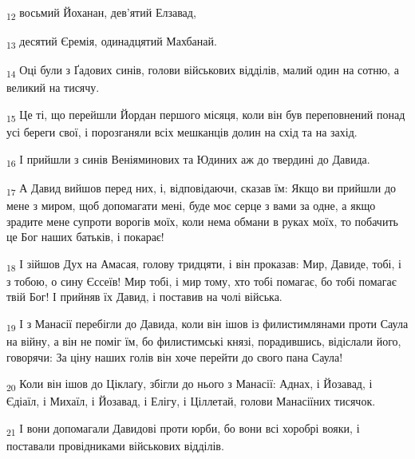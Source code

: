 \begin{tcolorbox}
\textsubscript{12} восьмий Йоханан, дев'ятий Елзавад,
\end{tcolorbox}
\begin{tcolorbox}
\textsubscript{13} десятий Єремія, одинадцятий Махбанай.
\end{tcolorbox}
\begin{tcolorbox}
\textsubscript{14} Оці були з Ґадових синів, голови військових відділів, малий один на сотню, а великий на тисячу.
\end{tcolorbox}
\begin{tcolorbox}
\textsubscript{15} Це ті, що перейшли Йордан першого місяця, коли він був переповнений понад усі береги свої, і порозганяли всіх мешканців долин на схід та на захід.
\end{tcolorbox}
\begin{tcolorbox}
\textsubscript{16} І прийшли з синів Веніяминових та Юдиних аж до твердині до Давида.
\end{tcolorbox}
\begin{tcolorbox}
\textsubscript{17} А Давид вийшов перед них, і, відповідаючи, сказав їм: Якщо ви прийшли до мене з миром, щоб допомагати мені, буде моє серце з вами за одне, а якщо зрадите мене супроти ворогів моїх, коли нема обмани в руках моїх, то побачить це Бог наших батьків, і покарає!
\end{tcolorbox}
\begin{tcolorbox}
\textsubscript{18} І зійшов Дух на Амасая, голову тридцяти, і він проказав: Мир, Давиде, тобі, і з тобою, о сину Єссеїв! Мир тобі, і мир тому, хто тобі помагає, бо тобі помагає твій Бог! І прийняв їх Давид, і поставив на чолі війська.
\end{tcolorbox}
\begin{tcolorbox}
\textsubscript{19} І з Манасії перебігли до Давида, коли він ішов із филистимлянами проти Саула на війну, а він не поміг їм, бо филистимські князі, порадившись, відіслали його, говорячи: За ціну наших голів він хоче перейти до свого пана Саула!
\end{tcolorbox}
\begin{tcolorbox}
\textsubscript{20} Коли він ішов до Ціклаґу, збігли до нього з Манасії: Аднах, і Йозавад, і Єдіаїл, і Михаїл, і Йозавад, і Елігу, і Ціллетай, голови Манасіїних тисячок.
\end{tcolorbox}
\begin{tcolorbox}
\textsubscript{21} І вони допомагали Давидові проти юрби, бо вони всі хоробрі вояки, і поставали провідниками військових відділів.
\end{tcolorbox}

